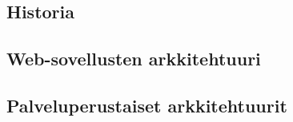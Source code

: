 
\subsection{Historia}

\subsection{Web-sovellusten arkkitehtuuri}

\subsection{Palveluperustaiset arkkitehtuurit}
